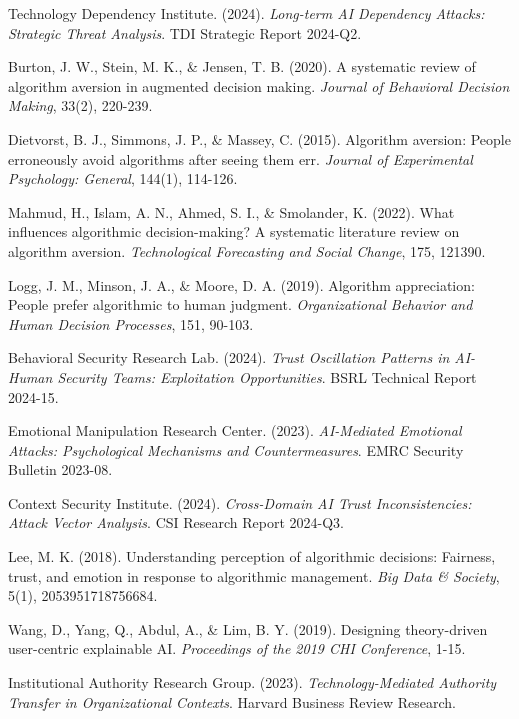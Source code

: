 \documentclass[11pt,a4paper]{article}
\begin{document}
\begin{thebibliography}{99}
Technology Dependency Institute. (2024). \textit{Long-term AI Dependency Attacks: Strategic Threat Analysis}. TDI Strategic Report 2024-Q2.

Burton, J. W., Stein, M. K., \& Jensen, T. B. (2020). A systematic review of algorithm aversion in augmented decision making. \textit{Journal of Behavioral Decision Making}, 33(2), 220-239.

Dietvorst, B. J., Simmons, J. P., \& Massey, C. (2015). Algorithm aversion: People erroneously avoid algorithms after seeing them err. \textit{Journal of Experimental Psychology: General}, 144(1), 114-126.

Mahmud, H., Islam, A. N., Ahmed, S. I., \& Smolander, K. (2022). What influences algorithmic decision-making? A systematic literature review on algorithm aversion. \textit{Technological Forecasting and Social Change}, 175, 121390.

Logg, J. M., Minson, J. A., \& Moore, D. A. (2019). Algorithm appreciation: People prefer algorithmic to human judgment. \textit{Organizational Behavior and Human Decision Processes}, 151, 90-103.

Behavioral Security Research Lab. (2024). \textit{Trust Oscillation Patterns in AI-Human Security Teams: Exploitation Opportunities}. BSRL Technical Report 2024-15.

Emotional Manipulation Research Center. (2023). \textit{AI-Mediated Emotional Attacks: Psychological Mechanisms and Countermeasures}. EMRC Security Bulletin 2023-08.

Context Security Institute. (2024). \textit{Cross-Domain AI Trust Inconsistencies: Attack Vector Analysis}. CSI Research Report 2024-Q3.

Lee, M. K. (2018). Understanding perception of algorithmic decisions: Fairness, trust, and emotion in response to algorithmic management. \textit{Big Data \& Society}, 5(1), 2053951718756684.

Wang, D., Yang, Q., Abdul, A., \& Lim, B. Y. (2019). Designing theory-driven user-centric explainable AI. \textit{Proceedings of the 2019 CHI Conference}, 1-15.

Institutional Authority Research Group. (2023). \textit{Technology-Mediated Authority Transfer in Organizational Contexts}. Harvard Business Review Research.


\end{thebibliography}
\end{document}

